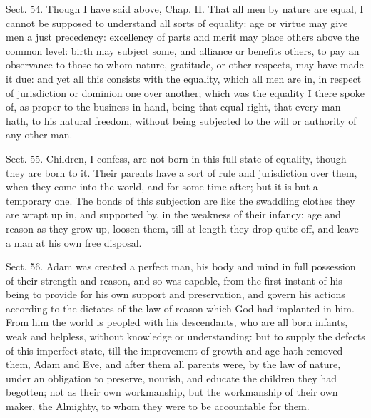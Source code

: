 \documentclass[11pt,openany]{book}
\begin{document}
Sect. 54. Though I have said above, Chap. II. That all men by nature are equal, I cannot be supposed to understand all sorts of equality: age or virtue may give men a just precedency: excellency of parts and merit may place others above the common level: birth may subject some, and alliance or benefits others, to pay an observance to those to whom nature, gratitude, or other respects, may have made it due: and yet all this consists with the equality, which all men are in, in respect of jurisdiction or dominion one over another; which was the equality I there spoke of, as proper to the business in hand, being that equal right, that every man hath, to his natural freedom, without being subjected to the will or authority of any other man.

Sect. 55. Children, I confess, are not born in this full state of equality, though they are born to it. Their parents have a sort of rule and jurisdiction over them, when they come into the world, and for some time after; but it is but a temporary one. The bonds of this subjection are like the swaddling clothes they are wrapt up in, and supported by, in the weakness of their infancy: age and reason as they grow up, loosen them, till at length they drop quite off, and leave a man at his own free disposal.

Sect. 56. Adam was created a perfect man, his body and mind in full possession of their strength and reason, and so was capable, from the first instant of his being to provide for his own support and preservation, and govern his actions according to the dictates of the law of reason which God had implanted in him. From him the world is peopled with his descendants, who are all born infants, weak and helpless, without knowledge or understanding: but to supply the defects of this imperfect state, till the improvement of growth and age hath removed them, Adam and Eve, and after them all parents were, by the law of nature, under an obligation to preserve, nourish, and educate the children they had begotten; not as their own workmanship, but the workmanship of their own maker, the Almighty, to whom they were to be accountable for them.
\end{document}
